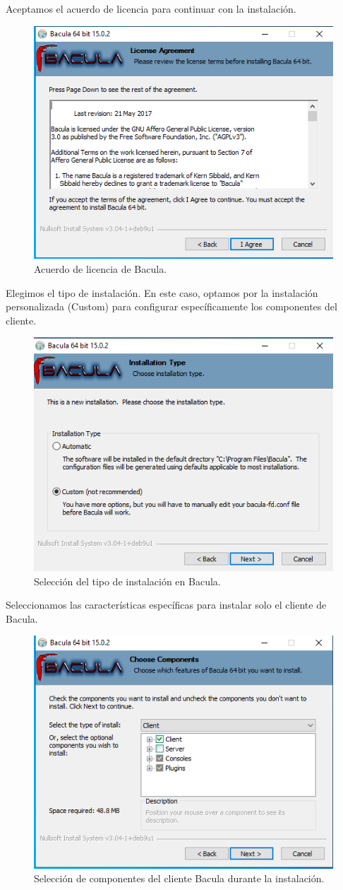 Aceptamos el acuerdo de licencia para continuar con la instalación.

\begin{figure}[H]
    \centering
    \includegraphics[width=0.5\linewidth]{instalacionBacula/lecencia.png}
    \caption{Acuerdo de licencia de Bacula.}
\end{figure}

Elegimos el tipo de instalación. En este caso, optamos por la instalación personalizada (Custom) para configurar específicamente los componentes del cliente.

\begin{figure}[H]
    \centering
    \includegraphics[width=0.5\linewidth]{instalacionBacula/custom.png}
    \caption{Selección del tipo de instalación en Bacula.}
\end{figure}

Seleccionamos las características específicas para instalar solo el cliente de Bacula.

\begin{figure}[H]
    \centering
    \includegraphics[width=0.5\linewidth]{instalacionBacula/clientecaracteristicas.png}
    \caption{Selección de componentes del cliente Bacula durante la instalación.}
\end{figure}


